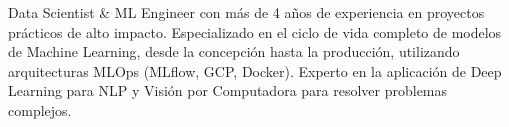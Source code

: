 

\begin{cvparagraph}

Data Scientist \& ML Engineer con más de 4 años de experiencia en proyectos prácticos de alto impacto. Especializado en el ciclo de vida completo de modelos de Machine Learning, desde la concepción hasta la producción, utilizando arquitecturas MLOps (MLflow, GCP, Docker). Experto en la aplicación de Deep Learning para NLP y Visión por Computadora para resolver problemas complejos.
\end{cvparagraph}
